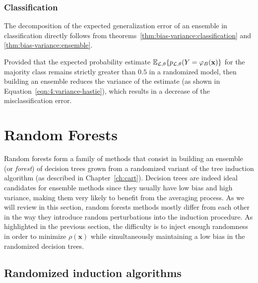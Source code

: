 \subsubsection{Classification}

The decomposition of the expected generalization error of an ensemble in
classification directly follows from theorems~\ref{thm:bias-variance:classification} and
\ref{thm:bias-variance:ensemble}.

Provided that the expected probability estimate $\mathbb{E}_{{\cal L},\theta}\{
p_{{\cal L},\theta}(Y=\varphi_B(\mathbf{x}) \}$ for the majority class remains
strictly greater than $0.5$ in a randomized model, then building an ensemble
reduces the variance of the estimate (as shown in Equation~\ref{eqn:4:variance-hastie}),
which results in a decrease of the misclassification error.


\section{Random Forests}
\label{sec:4:random-forests}

Random forests form a family of methods that consist in building an ensemble
(or \textit{forest}) of decision trees grown from a randomized variant of the
tree induction algorithm (as described in Chapter~\ref{ch:cart}). Decision
trees are indeed ideal candidates for ensemble methods since they usually have
low bias and high variance, making them very likely to benefit from the
averaging process. As we will review in this section, random forests methods
mostly differ from each other in the way they introduce random perturbations
into the induction procedure. As highlighted in the previous section, the
difficulty is to inject enough randomness in order to minimize
$\rho(\mathbf{x})$ while simultaneously maintaining a low bias in the
randomized decision trees.

\subsection{Randomized induction algorithms}

